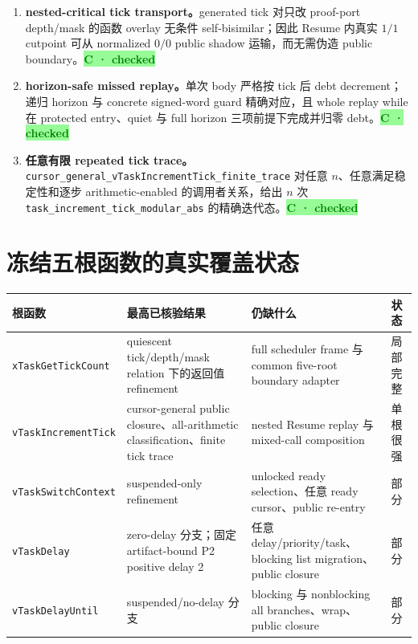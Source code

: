 \documentclass[11pt,a4paper,UTF8]{ctexart}
\newcommand{\checked}{\colorbox{paleGreen}{\textcolor{green}{\textbf{C · checked}}}}
\newcommand{\code}[1]{\nolinkurl{#1}}
\begin{document}
\begin{enumerate}
\begin{center}
        \end{center}
        该 relation 对调用方隐藏内部 witness 参数，并证明成功 tick
        重新建立同一 settled/unmasked public boundary。\checked
  \item \textbf{nested-critical tick transport。}generated tick 对只改 proof-port
        depth/mask 的函数 overlay 无条件 self-bisimilar；因此 Resume 内真实 $1/1$ cutpoint
        可从 normalized $0/0$ public shadow 运输，而无需伪造 public boundary。\checked
  \item \textbf{horizon-safe missed replay。}单次 body 严格按 tick 后 debt decrement；递归
        horizon 与 concrete signed-word guard 精确对应，且 whole replay while 在 protected
        entry、quiet 与 full horizon 三项前提下完成并归零 debt。\checked
  \item \textbf{任意有限 repeated tick trace。}
        \code{cursor_general_vTaskIncrementTick_finite_trace} 对任意 $n$、任意满足稳定性和逐步
        arithmetic-enabled 的调用者关系，给出 $n$ 次
        \code{task_increment_tick_modular_abs} 的精确迭代态。\checked
\end{enumerate}

\medskip

\section{冻结五根函数的真实覆盖状态}

{\small
\noindent\begin{tabularx}{\textwidth}{p{31mm}p{34mm}Y p{22mm}}
\toprule
根函数 & 最高已核验结果 & 仍缺什么 & 状态\\
\midrule
{\scriptsize\code{xTaskGetTickCount}} & quiescent tick/depth/mask relation 下的返回值 refinement & full scheduler frame 与 common five-root boundary adapter & 局部完整\\
{\scriptsize\code{vTaskIncrementTick}} & cursor-general public closure、all-arithmetic classification、finite tick trace & nested Resume replay 与 mixed-call composition & 单根很强\\
{\scriptsize\code{vTaskSwitchContext}} & suspended-only refinement & unlocked ready selection、任意 ready cursor、public re-entry & 部分\\
{\scriptsize\code{vTaskDelay}} & zero-delay 分支；固定 artifact-bound P2 positive delay 2 & 任意 delay/priority/task、blocking list migration、public closure & 部分\\
{\scriptsize\code{vTaskDelayUntil}} & suspended/no-delay 分支 & blocking 与 nonblocking all branches、wrap、public closure & 部分\\
\bottomrule
\end{tabularx}
}
\end{document}
